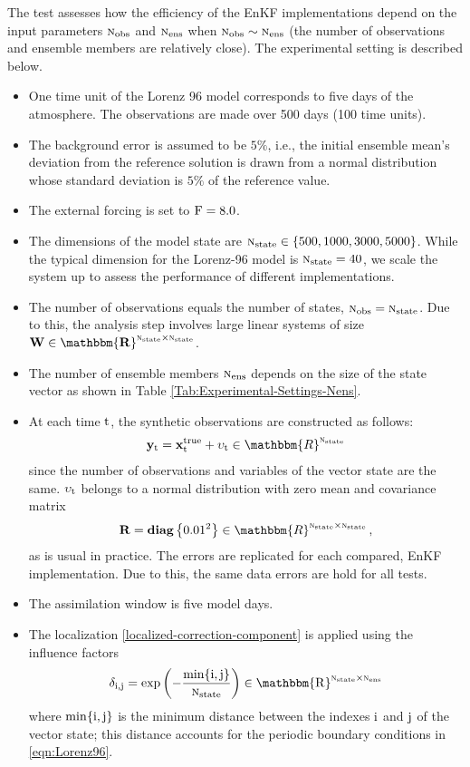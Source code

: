 \documentclass[12pt]{article}
\newcommand{\Nobs}{\textsc{n}_{{\rm obs}}}
\newcommand{\Nens}{\textsc{n}_{{\rm ens}}}
\newcommand{\Nstate}{\textsc{n}_{{\rm state}}}
\newcommand{\R}{{\bf R}}
\newcommand{\y}[1]{{\bf y}_{{\rm #1}}}
\newcommand{\xt}{{\bf x}^{\rm true}}
\renewcommand{\Re}{\mathbbm{R}}
\newcommand{\e}[1]{{\bf \upsilon}_{{\rm #1}}}
\begin{document}
The test assesses how the efficiency of the EnKF implementations depend on the input parameters $\Nobs$ and $\Nens$ when $\Nobs \sim \Nens$ (the number of observations and ensemble members are relatively close). The experimental setting is described below.

\begin{itemize}
\item One time unit of the Lorenz 96 model corresponds to five days of the atmosphere. The observations are made over 500 days (100 time units).
\item The background error is assumed to be $5\% $, i.e., the initial ensemble mean's deviation from the reference solution is drawn from a normal distribution
whose standard deviation is $5\%$ of the reference value.
\item The external forcing is set to $\rm F = 8.0$. 
\item The dimensions of the model state  are $\Nstate \in \{ 500, 1000, 3000, 5000\}$. While the typical dimension for the Lorenz-96 model is $\Nstate=40$,
we scale the system up to assess the performance of different implementations.
\item The number of observations equals the number of states, $\Nobs = \Nstate$. Due to this, the analysis step involves large linear systems of size $\bf W \in \Re^{\Nstate \times \Nstate}$. 
\item The number of ensemble members $\Nens$ depends on the size of the state vector as shown in Table  \ref{Tab:Experimental-Settings-Nens}.

\item At each time $\rm t$, the synthetic observations are constructed as follows:
\begin{eqnarray}
\label{eq:syntethic-observations}
\displaystyle \y{t} = \xt_{\rm t}+\e{t} \in \Re^{\Nstate}
\end{eqnarray}
since the number of observations and variables of the vector state are the same. $\e{t}$ belongs to a normal distribution with zero mean and covariance matrix
\begin{eqnarray*}
\displaystyle \R =  {\bf diag}\left \{ 0.01^2 \right \} \in \Re^{\Nstate \times \Nstate} \, ,
\end{eqnarray*} 
as is usual in practice. The errors are replicated for each compared, EnKF implementation. Due to this, the same data errors are hold for all tests. 

\item The assimilation window is five model days.

\item The localization \eqref{localized-correction-component} is applied using the influence factors
\begin{eqnarray} \nonumber
\label{Results:Lorenz-Multiplication}
\delta_{\rm i, \rm j} = \rm exp \left( -\frac{min\{i,j\}}{\Nstate}\right ) \in \Re^{\Nstate \times \Nens}
\end{eqnarray}
where $\rm min\{i,j\}$ is the minimum distance between the indexes $\rm i$ and $\rm j$ of the vector state; this distance accounts for the
periodic boundary conditions in \eqref{eqn:Lorenz96}.

\end{itemize}
\end{document}
